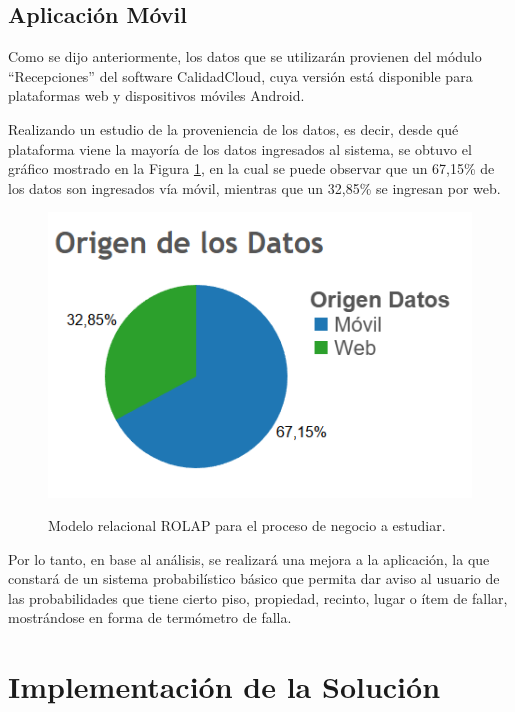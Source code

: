 \documentclass[letter,12pt,oneside]{report}
\begin{document}
\section{Aplicación Móvil}
Como se dijo anteriormente, los datos que se utilizarán provienen del módulo “Recepciones” del software CalidadCloud, cuya versión está disponible para plataformas web y dispositivos móviles Android.

Realizando un estudio de la proveniencia de los datos, es decir, desde qué plataforma viene la mayoría de los datos ingresados al sistema, se obtuvo el gráfico mostrado en la Figura \ref{origen}, en la cual se puede observar que un 67,15\% de los datos son ingresados vía móvil, mientras que un 32,85\% se ingresan por web. 

\begin{figure}[H]
\begin{center}
\includegraphics[scale=1]{images/origen.PNG}
\caption{Modelo relacional ROLAP para el proceso de negocio a estudiar.}
\label{origen}
\end{center}
\end{figure}

Por lo tanto, en base al análisis, se realizará una mejora a la aplicación, la que constará de un sistema probabilístico básico que permita dar aviso al usuario de las probabilidades que tiene cierto piso, propiedad, recinto, lugar o ítem de fallar, mostrándose en forma de termómetro de falla.

\newpage
\chapter{Implementación de la Solución}
\end{document}
